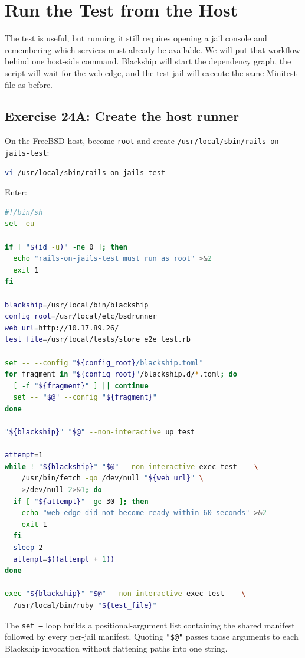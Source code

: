 \chapter{Run the Test from the Host}

The test is useful, but running it still requires opening a jail console and
remembering which services must already be available. We will put that
workflow behind one host-side command. Blackship will start the dependency
graph, the script will wait for the web edge, and the test jail will execute
the same Minitest file as before.

\section{Exercise 24A: Create the host runner}

On the FreeBSD host, become \texttt{root} and create
\texttt{/usr/local/sbin/rails-on-jails-test}:

\begin{lstlisting}[language=sh]
vi /usr/local/sbin/rails-on-jails-test
\end{lstlisting}

Enter:

\begin{lstlisting}[language=sh]
#!/bin/sh
set -eu

if [ "$(id -u)" -ne 0 ]; then
  echo "rails-on-jails-test must run as root" >&2
  exit 1
fi

blackship=/usr/local/bin/blackship
config_root=/usr/local/etc/bsdrunner
web_url=http://10.17.89.26/
test_file=/usr/local/tests/store_e2e_test.rb

set -- --config "${config_root}/blackship.toml"
for fragment in "${config_root}"/blackship.d/*.toml; do
  [ -f "${fragment}" ] || continue
  set -- "$@" --config "${fragment}"
done

"${blackship}" "$@" --non-interactive up test

attempt=1
while ! "${blackship}" "$@" --non-interactive exec test -- \
    /usr/bin/fetch -qo /dev/null "${web_url}" \
    >/dev/null 2>&1; do
  if [ "${attempt}" -ge 30 ]; then
    echo "web edge did not become ready within 60 seconds" >&2
    exit 1
  fi
  sleep 2
  attempt=$((attempt + 1))
done

exec "${blackship}" "$@" --non-interactive exec test -- \
  /usr/local/bin/ruby "${test_file}"
\end{lstlisting}

The \texttt{set --} loop builds a positional-argument list containing the
shared manifest followed by every per-jail manifest. Quoting \texttt{"\$@"}
passes those arguments to each Blackship invocation without flattening paths
into one string.

